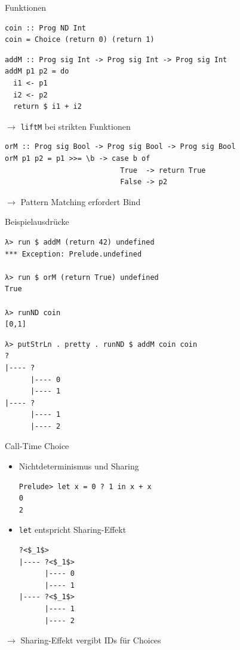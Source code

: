 \documentclass{beamer}
\newcommand{\haskellinline}[1]{\texttt{#1}}
\begin{document}
\begin{frame}[fragile]{Funktionen}
\begin{verbatim}
coin :: Prog ND Int
coin = Choice (return 0) (return 1)
\end{verbatim}
\pause
\begin{verbatim}
addM :: Prog sig Int -> Prog sig Int -> Prog sig Int
addM p1 p2 = do
  i1 <- p1
  i2 <- p2
  return $ i1 + i2
\end{verbatim}
$\rightarrow$ \haskellinline{liftM} bei strikten Funktionen
\pause
\begin{verbatim}
orM :: Prog sig Bool -> Prog sig Bool -> Prog sig Bool
orM p1 p2 = p1 >>= \b -> case b of
                           True  -> return True
                           False -> p2
\end{verbatim}
$\rightarrow$ Pattern Matching erfordert Bind
\end{frame}

\begin{frame}[fragile]{Beispielausdrücke}
\begin{verbatim}
λ> run $ addM (return 42) undefined
*** Exception: Prelude.undefined

λ> run $ orM (return True) undefined
True

λ> runND coin
[0,1]
\end{verbatim}
\pause
\begin{verbatim}
λ> putStrLn . pretty . runND $ addM coin coin
?
|---- ?
      |---- 0
      |---- 1
|---- ?
      |---- 1
      |---- 2
\end{verbatim}
\end{frame}

\begin{frame}[fragile]{Call-Time Choice}
\begin{itemize}
\item Nichtdeterminismus und \alert{Sharing}
\begin{verbatim}
Prelude> let x = 0 ? 1 in x + x
0
2
\end{verbatim}
\item \haskellinline{let} entspricht Sharing-Effekt
\begin{verbatim}
?<$_1$>
|---- ?<$_1$>
      |---- 0
      |---- 1
|---- ?<$_1$>
      |---- 1
      |---- 2
\end{verbatim}
\end{itemize}
$\rightarrow$ Sharing-Effekt vergibt \alert{IDs} für Choices
\end{frame}
\end{document}
